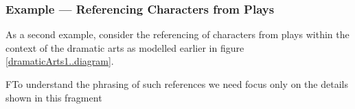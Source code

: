 \subsubsection{Example --- Referencing Characters from Plays}
\label{exampleReferencingCharacters}
\mynote
 As a second example, consider the referencing of characters from  plays
 within the context of  the  dramatic arts
  as modelled earlier in figure \ref{dramaticArts1..diagram}.

FTo understand the phrasing of such references we need focus only on the details shown in this fragment 
\begin{equation*}

\end{equation*}

